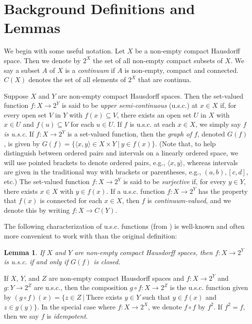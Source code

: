 \documentclass{amsart}
\newtheorem{lemma}[theorem]{Lemma}
\theoremstyle{definition}
\newcommand{\<}{\langle}
\renewcommand{\>}{\rangle}
\begin{document}
\section{Background Definitions and Lemmas}

We begin with some useful notation. Let $X$ be a non-empty compact Hausdorff space. Then we denote by $2^X$ the set of all non-empty compact subsets of $X$. We say a subset $A$ of $X$ is a \emph{continuum} if $A$ is non-empty, compact and connected. $C(X)$ denotes the set of all elements of $2^X$ that are continua.

Suppose $X$ and $Y$ are non-empty compact Hausdorff spaces. Then the set-valued function $f: X \rightarrow 2^{Y}$ is said to be \emph{upper semi-continuous} (u.s.c.) at $x \in X$ if, for every open set $V$ in $Y$ with $f(x) \subseteq V$, there exists an open set $U$ in $X$ with $x \in U$ and $f(u) \subseteq V$ for each $u \in U$. If $f$ is u.s.c. at each $x \in X$, we simply say \emph{$f$ is u.s.c.} If $f: X \rightarrow 2^{Y}$ is a set-valued function, then the \emph{graph of $f$}, denoted $G(f)$, is given by $G(f) = \{\langle x , y \rangle \in X \times Y \ | \ y \in f(x)\}$. (Note that, to help distinguish between ordered pairs and intervals on a linearly ordered space, we will use pointed brackets to denote ordered pairs, e.g., $\langle x , y \rangle$, whereas intervals are given in the traditional way with brackets or parentheses, e.g., $(a,b), [c,d]$, etc.) The set-valued function $f: X \rightarrow 2^{Y}$ is said to be \emph{surjective} if, for every $y \in Y$, there exists $x \in X$ with $y \in f(x)$. If a u.s.c. function $f: X \rightarrow 2^{Y}$ has the property that $f(x)$ is connected for each $x \in X$, then $f$ is \emph{continuum-valued}, and we denote this by writing  $f: X \rightarrow C(Y).$

The following characterization of u.s.c. functions (from \cite{i m paper}) is well-known and often more convenient to work with than the original definition:

\begin{lemma} If $X$ and $Y$ are non-empty compact Hausdorff spaces, then $f: X \rightarrow 2^{Y}$ is u.s.c. if and only if $G(f)$ is closed.
\end{lemma}

If $X$, $Y$, and $Z$ are non-empty compact Hausdorff spaces and $f : X \rightarrow 2^{Y}$ and $g: Y \rightarrow 2^{Z}$ are u.s.c., then the composition $g \circ f : X \rightarrow 2^{Z}$ is the u.s.c. function given by $(g \circ f)(x) = \{z \in Z \ | \ $There exists $y \in Y$ such that $y \in f(x)$ and $z \in g(y)\}$. In the special case where $f: X \rightarrow 2^{X}$, we denote $f \circ f$ by $f^2$. If $f^2 = f$, then we say $f$ is \emph{idempotent}.
\end{document}
